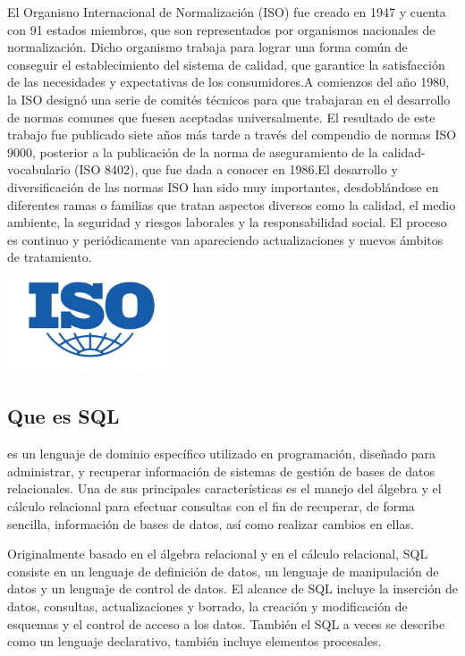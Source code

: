 \documentclass[twoside,twocolumn]{article}
\begin{document}
El Organisno Internacional de Normalización (ISO) fue creado en 1947 y cuenta con 91 estados miembros, que son representados por organismos nacionales de normalización. Dicho organismo trabaja para lograr una forma común de conseguir el establecimiento del sistema de calidad, que garantice la satisfacción de las necesidades y expectativas de los consumidores.A comienzos del año 1980, la ISO designó una serie de comités técnicos para que trabajaran en el desarrollo de normas comunes que fuesen aceptadas universalmente. El resultado de este trabajo fue publicado siete años más tarde a través del compendio de normas ISO 9000, posterior a la publicación de la norma de aseguramiento de la calidad-vocabulario (ISO 8402), que fue dada a conocer en 1986.El desarrollo y diversificación de las normas ISO han sido muy importantes, desdoblándose en diferentes ramas o familias que tratan aspectos diversos como la calidad, el medio ambiente, la seguridad y riesgos laborales y la responsabilidad social. El proceso es continuo y periódicamente van apareciendo actualizaciones y nuevos ámbitos de tratamiento.

\begin{center}
	\includegraphics[width=5cm]{./Imagenes/iso} 
\end{center}

\subsection{Que es SQL}
es un lenguaje de dominio específico utilizado en programación, diseñado para administrar, y recuperar información de sistemas de gestión de bases de datos relacionales. Una de sus principales características es el manejo del álgebra y el cálculo relacional para efectuar consultas con el fin de recuperar, de forma sencilla, información de bases de datos, así como realizar cambios en ellas.

Originalmente basado en el álgebra relacional y en el cálculo relacional, SQL consiste en un lenguaje de definición de datos, un lenguaje de manipulación de datos y un lenguaje de control de datos. El alcance de SQL incluye la inserción de datos, consultas, actualizaciones y borrado, la creación y modificación de esquemas y el control de acceso a los datos. También el SQL a veces se describe como un lenguaje declarativo, también incluye elementos procesales.
\end{document}
